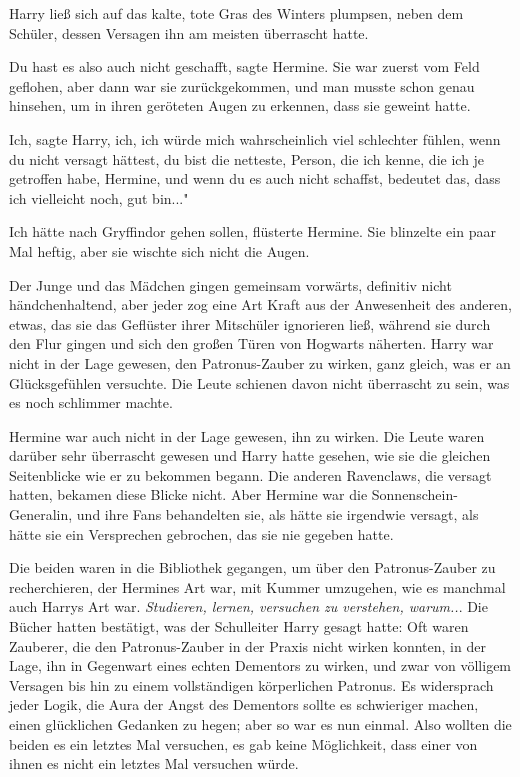 Harry ließ sich auf das kalte, tote Gras des Winters plumpsen, neben dem
Schüler, dessen Versagen ihn am meisten überrascht hatte.

\glqq Du hast es also auch nicht geschafft\grqq{}, sagte Hermine. Sie war zuerst
vom Feld geflohen, aber dann war sie zurückgekommen, und man musste schon genau
hinsehen, um in ihren geröteten Augen zu erkennen, dass sie geweint hatte.

\glqq Ich\grqq{}, sagte Harry, \glqq ich, ich würde mich wahrscheinlich viel
schlechter fühlen, wenn du nicht versagt hättest, du bist die netteste, Person,
die ich kenne, die ich je getroffen habe, Hermine, und wenn du es auch nicht
schaffst, bedeutet das, dass ich vielleicht noch, gut bin..."

\glqq Ich hätte nach Gryffindor gehen sollen\grqq{}, flüsterte Hermine. Sie
blinzelte ein paar Mal heftig, aber sie wischte sich nicht die Augen.

Der Junge und das Mädchen gingen gemeinsam vorwärts, definitiv nicht
händchenhaltend, aber jeder zog eine Art Kraft aus der Anwesenheit des anderen,
etwas, das sie das Geflüster ihrer Mitschüler ignorieren ließ, während sie durch
den Flur gingen und sich den großen Türen von Hogwarts näherten. Harry war nicht
in der Lage gewesen, den Patronus-Zauber zu wirken, ganz gleich, was er an
Glücksgefühlen versuchte. Die Leute schienen davon nicht überrascht zu sein, was
es noch schlimmer machte.

Hermine war auch nicht in der Lage gewesen, ihn zu wirken. Die Leute waren
darüber sehr überrascht gewesen und Harry hatte gesehen, wie sie die gleichen
Seitenblicke wie er zu bekommen begann. Die anderen Ravenclaws, die versagt
hatten, bekamen diese Blicke nicht. Aber Hermine war die Sonnenschein-Generalin,
und ihre Fans behandelten sie, als hätte sie irgendwie versagt, als hätte sie
ein Versprechen gebrochen, das sie nie gegeben hatte.

Die beiden waren in die Bibliothek gegangen, um über den Patronus-Zauber zu
recherchieren, der Hermines Art war, mit Kummer umzugehen, wie es manchmal auch
Harrys Art war. \emph{Studieren, lernen, versuchen zu verstehen, warum..}. Die
Bücher hatten bestätigt, was der Schulleiter Harry gesagt hatte: Oft waren
Zauberer, die den Patronus-Zauber in der Praxis nicht wirken konnten, in der
Lage, ihn in Gegenwart eines echten Dementors zu wirken, und zwar von völligem
Versagen bis hin zu einem vollständigen körperlichen Patronus. Es widersprach
jeder Logik, die Aura der Angst des Dementors sollte es schwieriger machen,
einen glücklichen Gedanken zu hegen; aber so war es nun einmal. Also wollten die
beiden es ein letztes Mal versuchen, es gab keine Möglichkeit, dass einer von
ihnen es nicht ein letztes Mal versuchen würde.

